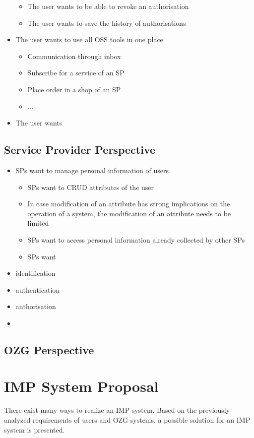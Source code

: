 \documentclass[
     12pt,         %
     a4paper,      %
     BCOR=10mm,version=first,     %
     DIV=14,version=first,        %
     ]{scrreprt}
\begin{document}
\begin{itemize}
\begin{itemize}
        \item The user wants to be able to revoke an authorisation
        \item The user wants to save the history of authorisations
    \end{itemize}
    \item The user wants to use all OSS tools in one place
    \begin{itemize}
        \item Communication through inbox
        \item Subscribe for a service of an SP
        \item Place order in a shop of an SP
        \item ...
    \end{itemize}
    \item The user wants

\end{itemize}

\subsection{Service Provider Perspective}

\begin{itemize}
    \item SPs want to manage personal information of users
    \begin{itemize}
        \item SPs want to CRUD attributes of the user
        \item In case modification of an attribute has strong implications on the operation of a system, the modification of an attribute needs to be limited
        \item SPs want to access personal information already collected by other SPs
        \item SPs want 
    \end{itemize}
    \item identification
    \item authentication
    \item authorisation
    \item 
\end{itemize}

\subsection{OZG Perspective}

\section{IMP System Proposal}
There exist many ways to realize an IMP system. Based on the previously analyzed requirements of users and OZG systems, a possible solution for an IMP system is presented.
\end{document}
